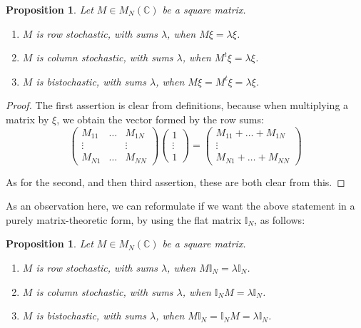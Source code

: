 \documentclass[12pt]{amsbook}
\newtheorem{proposition}[theorem]{Proposition}
\begin{document}
\begin{proposition}
Let $M\in M_N(\mathbb C)$ be a square matrix.
\begin{enumerate}
\item $M$ is row stochastic, with sums $\lambda$, when $M\xi=\lambda\xi$.

\item $M$ is column stochastic, with sums $\lambda$, when $M^t\xi=\lambda\xi$.

\item $M$ is bistochastic, with sums $\lambda$, when $M\xi=M^t\xi=\lambda\xi$.
\end{enumerate}
\end{proposition}

\begin{proof}
The first assertion is clear from definitions, because when multiplying a matrix by $\xi$, we obtain the vector formed by the row sums:
$$\begin{pmatrix}
M_{11}&\ldots&M_{1N}\\
\vdots&&\vdots\\
M_{N1}&\ldots&M_{NN}
\end{pmatrix}
\begin{pmatrix}
1\\
\vdots\\
1
\end{pmatrix}
=\begin{pmatrix}
M_{11}+\ldots+M_{1N}\\
\vdots\\
M_{N1}+\ldots+M_{NN}
\end{pmatrix}$$

As for the second, and then third assertion, these are both clear from this.
\end{proof}

As an observation here, we can reformulate if we want the above statement in a purely matrix-theoretic form, by using the flat matrix $\mathbb I_N$, as follows:


\begin{proposition}
Let $M\in M_N(\mathbb C)$ be a square matrix.
\begin{enumerate}
\item $M$ is row stochastic, with sums $\lambda$, when $M\mathbb I_N=\lambda\mathbb I_N$.

\item $M$ is column stochastic, with sums $\lambda$, when $\mathbb I_NM=\lambda\mathbb I_N$.

\item $M$ is bistochastic, with sums $\lambda$, when $M\mathbb I_N=\mathbb I_NM=\lambda\mathbb I_N$.
\end{enumerate}
\end{proposition}
\end{document}
